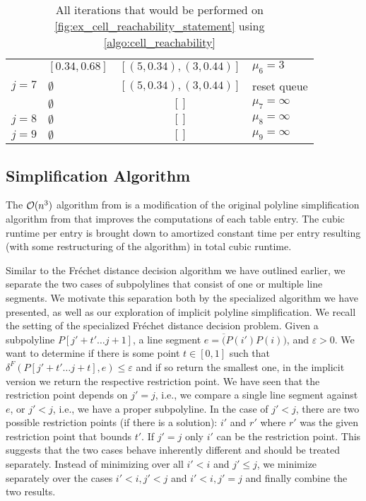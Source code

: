 \begin{table}[htb]
\begin{tabular}{|llcl|}
						& \([0.34, 0.68]\) & \([(5, 0.34), (3, 0.44)]\) & \(\mu_6 = 3\)\\
		\(j=7\) & \(\emptyset\)    & \([(5, 0.34), (3, 0.44)]\) & reset queue\\
		        & \(\emptyset\)    & \([]\) & \(\mu_7 = \infty\)\\
		\(j=8\) & \(\emptyset\)    & \([]\) & \(\mu_8 = \infty\)\\
		\(j=9\) & \(\emptyset\)    & \([]\) & \(\mu_9 = \infty\)\\
		\hline 
  \end{tabular}
	\caption{All iterations that would be performed on \cref{fig:ex_cell_reachability_statement} using \cref{algo:cell_reachability}}
	\label{tab:cell_reachability_execution}
\end{table}

\subsection{Simplification Algorithm}
\label{ssec:simplification_algo_cubic}

The \(\mathcal{O}(n^3)\) algorithm from \citeauthor{polyline_simplification_has_cubic_complexity_bringmannetal} is a modification of the original polyline simplification algorithm from \citeauthor{on_optimal_polyline_simplification_using_the_hausdorff_and_frechet_distance} that improves the computations of each table entry. The cubic runtime per entry is brought down to amortized constant time per entry resulting (with some restructuring of the algorithm) in total cubic runtime. 

Similar to the Fréchet distance decision algorithm we have outlined earlier, we separate the two cases of subpolylines that consist of one or multiple line segments. We motivate this separation both by the specialized algorithm we have presented, as well as our exploration of implicit polyline simplification. We recall the setting of the specialized Fréchet distance decision problem. Given a subpolyline \(P[j' + t' \dots j + 1]\), a line segment \(e = \overline(P(i')P(i))\), and \(\varepsilon > 0\). We want to determine if there is some point \(t \in [0, 1]\) such that \(\delta^F(P[j' + t' \dots j + t], e) \leq \varepsilon\) and if so return the smallest one, in the implicit version we return the respective restriction point. We have seen that the restriction point depends on \(j' = j\), i.e., we compare a single line segment against \(e\), or \(j' < j\), i.e., we have a proper subpolyline. 
In the case of \(j' < j\), there are two possible restriction points (if there is a solution): \(i'\) and \(r'\) where \(r'\) was the given restriction point that bounds \(t'\). If \(j' = j\) only \(i'\) can be the restriction point. This suggests that the two cases behave inherently different and should be treated separately. Instead of minimizing over all \(i' < i\) and \(j' \leq j\), we minimize separately over the cases \(i' < i, j' < j\) and \(i' < i, j' = j\) and finally combine the two results.

